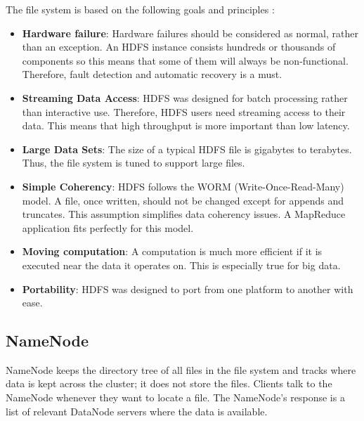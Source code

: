 \noindent The file system is based on the following goals and principles \cite{Hadoop-current}:
\begin{itemize}
	\item \textbf{Hardware failure}: Hardware failures should be considered as normal, rather than an exception. An HDFS instance consists hundreds or thousands of components so this means that some of them will always be non-functional. Therefore, fault detection and automatic recovery is a must.
	\item \textbf{Streaming Data Access}: HDFS was designed for batch processing rather than interactive use. Therefore, HDFS users need streaming access to their data. This means that high throughput is more important than low latency.
	\item \textbf{Large Data Sets}: The size of a typical HDFS file is gigabytes to terabytes. Thus, the file system is tuned to support large files. 
	\item \textbf{Simple Coherency}: HDFS follows the WORM (Write-Once-Read-Many) model. A file, once written, should not be changed except for appends and truncates.  This assumption simplifies data coherency issues. A MapReduce application fits perfectly for this model.
	\item \textbf{Moving computation}: A computation is much more efficient if it is executed near the data it operates on. This is especially true for big data. 
	\item \textbf{Portability}: HDFS was designed to port from one platform to another with ease. 
\end{itemize}

\subsection{NameNode}
NameNode keeps the directory tree of all files in the file system and tracks where data is kept across the cluster; it does not store the files. Clients talk to the NameNode whenever they want to locate a file. The NameNode's response is a list of relevant DataNode servers where the data is available. 

